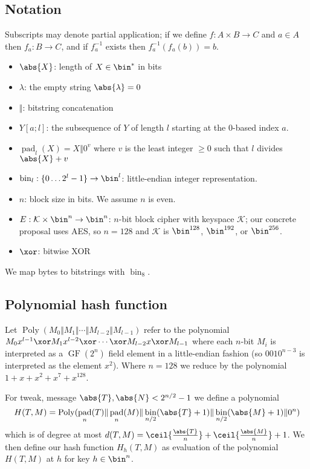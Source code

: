 \documentclass[letterpaper,11pt]{article}
\newcommand*{\Concat}{\Vert}
\DeclareMathOperator{\fromint}{bin}
\DeclareMathOperator{\GF}{GF}
\DeclareMathOperator{\pad}{pad}
\DeclareMathOperator{\Poly}{Poly}
\begin{document}
\subsection{Notation}
Subscripts may denote partial application; if we define $f: A \times B \rightarrow C$ and
$a \in A$ then $f_a: B \rightarrow C$, and if $f_a^{-1}$ exists then $f_a^{-1}(f_a(b)) = b$.
\begin{itemize}
    \item $\abs{X}$: length of $X \in \bin^{*}$ in bits
    \item $\lambda$: the empty string $\abs{\lambda} = 0$
    \item $\Concat$: bitstring concatenation
    \item $Y[a;l]$: the subsequence of $Y$ of length $l$ starting at the 0-based index $a$.
    \item $\pad_l(X) = X \Concat 0^v$
    where $v$ is the least integer $\geq 0$ such that $l$ divides $\abs{X} + v$
    \item $\fromint_l: \{0 \ldots 2^l-1\} \rightarrow \bin^l$: little-endian integer representation.
    \item \(n\): block size in bits. We assume \(n\) is even.
    \item \(E: \mathcal{K} \times \bin^n \rightarrow \bin^n\): 
    \(n\)-bit block cipher with keyspace \(\mathcal{K}\);
    our concrete proposal uses AES, so \(n=128\) and \(\mathcal{K}\) is
    \(\bin^{128}\), \(\bin^{192}\), or \(\bin^{256}\). 
    \item \(\xor\): bitwise XOR
\end{itemize}
We map bytes to bitstrings with \(\fromint_8\).

\subsection{Polynomial hash function}

Let \(\Poly(M_0 \Concat M_1 \Concat \cdots \Concat M_{l-2} \Concat M_{l-1})\)
refer to the polynomial
\(M_0x^{l-1} \xor M_1x^{l-2} \xor \cdots \xor M_{l-2}x \xor M_{l-1}\)
where each \(n\)-bit \(M_i\) is interpreted as a \(\GF(2^n)\)
field element in a little-endian fashion
(so \(0010^{n-3}\) is interpreted as the element \(x^2\)).
Where \(n=128\) we reduce by the polynomial
\(1 + x + x^2 + x^7 + x^{128}\).

For tweak, message \(\abs{T}, \abs{N} < 2^{n/2} -1\) we define a polynomial
\begin{displaymath}
    H(T, M) = \Poly(\pad_n(T) \Concat \pad_n(M) \Concat \fromint_{n/2}(\abs{T} + 1) \Concat \fromint_{n/2}(\abs{M} + 1) \Concat 0^n)
\end{displaymath}
which is of degree at most
\(d(T, M) = \ceil{\frac{\abs{T}}{n}} + \ceil{\frac{\abs{M}}{n}} + 1\).
We then define our hash function \(H_h(T, M)\) as evaluation
of the polynomial \(H(T, M)\) at \(h\) for key \(h \in \bin^n\).
\end{document}
